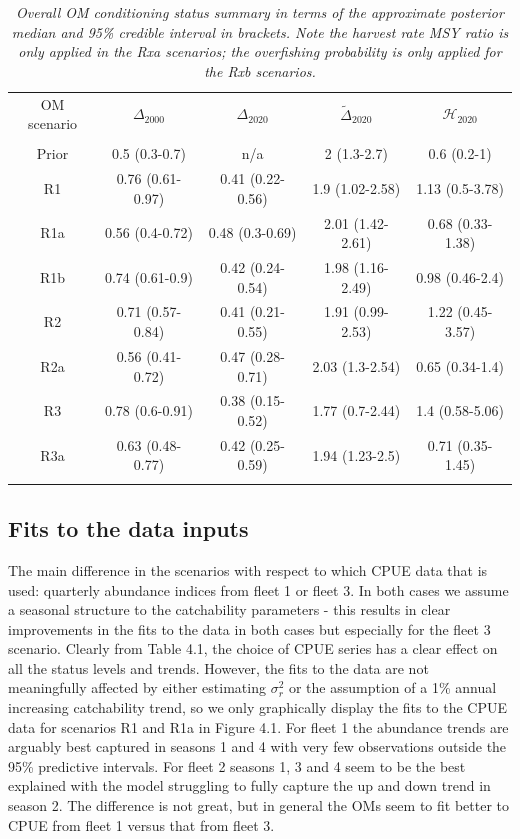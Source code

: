 \documentclass[12pt,a4paper,twoside,times,sky,standard]{csiroreport2017}
\newcommand{\sigr}{\sigma^2_r}
\begin{document}
\begin{table}[hb]
    \begin{center}
        \begin{tabular}{|ccccc|}
            \hline
            OM scenario & $\Delta_{2000}$ & $\Delta_{2020}$ & $\tilde{\Delta}_{2020}$ & $\mathcal{H}_{2020}$\\
            & & & & \\
Prior & 0.5 (0.3-0.7)    & n/a              & 2 (1.3-2.7)      & 0.6 (0.2-1) \\
R1    & 0.76 (0.61-0.97) & 0.41 (0.22-0.56) & 1.9 (1.02-2.58)  & 1.13 (0.5-3.78) \\
R1a   & 0.56 (0.4-0.72)  & 0.48 (0.3-0.69)  & 2.01 (1.42-2.61) & 0.68 (0.33-1.38) \\
R1b   & 0.74 (0.61-0.9)  & 0.42 (0.24-0.54) & 1.98 (1.16-2.49) & 0.98 (0.46-2.4) \\
R2    & 0.71 (0.57-0.84) & 0.41 (0.21-0.55) & 1.91 (0.99-2.53) & 1.22 (0.45-3.57) \\
R2a   & 0.56 (0.41-0.72) & 0.47 (0.28-0.71) & 2.03 (1.3-2.54)  & 0.65 (0.34-1.4) \\
R3    & 0.78 (0.6-0.91)  & 0.38 (0.15-0.52) & 1.77 (0.7-2.44)  & 1.4 (0.58-5.06) \\
R3a   & 0.63 (0.48-0.77) & 0.42 (0.25-0.59) & 1.94 (1.23-2.5)  & 0.71 (0.35-1.45) \\
            & & & & \\
            \hline
        \end{tabular}
    \end{center}
    \caption{\textit{Overall OM conditioning status summary in terms of the approximate posterior median and 95\% credible interval in brackets. Note the harvest rate MSY ratio is only applied in the Rxa scenarios; the overfishing probability is only applied for the Rxb scenarios.}}
\end{table}

\subsection{Fits to the data inputs}

The main difference in the scenarios with respect to which CPUE data that is used: quarterly
abundance indices from fleet 1 or fleet 3. In both cases we assume a seasonal structure to the
catchability parameters - this results in clear improvements in the fits to the data in both cases
but especially for the fleet 3 scenario. Clearly from Table 4.1, the choice of CPUE series has a
clear effect on all the status levels and trends. However, the fits to the data are not meaningfully
affected by either estimating $\sigr$ or the assumption of a 1\% annual increasing catchability trend,
so we only graphically display the fits to the CPUE data for scenarios R1 and R1a in Figure 4.1.
For fleet 1 the abundance trends are arguably best captured in seasons 1 and 4 with very few
observations outside the 95\% predictive intervals. For fleet 2 seasons 1, 3 and 4 seem to be the
best explained with the model struggling to fully capture the up and down trend in season 2. The
difference is not great, but in general the OMs seem to fit better to CPUE from fleet 1 versus that
from fleet 3.
\end{document}

